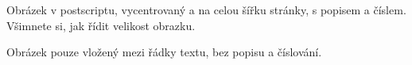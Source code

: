 \documentclass[11pt]{article}
\begin{document}
Obrázek v postscriptu, vycentrovaný a na celou šířku stránky, s
popisem a číslem. Všimnete si, jak řídit velikost obrazku.

Obrázek pouze vložený mezi řádky textu, bez popisu a číslování.\\

%


\end{document}
